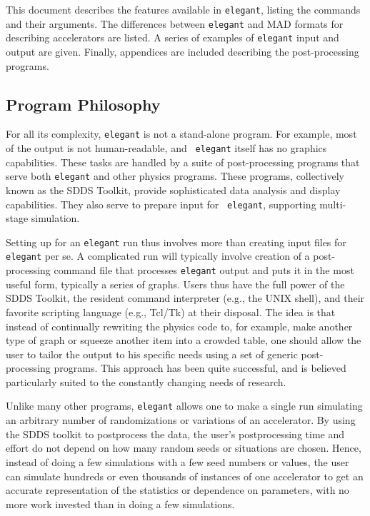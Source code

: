 \documentclass[11pt]{article}
\begin{document}
This document describes the features available in {\tt elegant},
listing the commands and their arguments.  The differences between
{\tt elegant} and MAD formats for describing accelerators are listed.
A series of examples of {\tt elegant} input and output are given.
Finally, appendices are included describing the post-processing
programs.

\subsection{Program Philosophy}

For all its complexity, {\tt elegant} is not a stand-alone program.
For example, most of the output is not human-readable, and {\tt
elegant} itself has no graphics capabilities.  These tasks are handled
by a suite of post-processing programs that serve both {\tt elegant}
and other physics programs.  These programs, collectively known as the
SDDS Toolkit\cite{SDDS1,SDDS2}, provide sophisticated data analysis
and display capabilities.  They also serve to prepare input for {\tt
elegant}, supporting multi-stage simulation.

Setting up for an {\tt elegant} run thus involves more than creating
input files for {\tt elegant} per se.  A complicated run will
typically involve creation of a post-processing command file that
processes {\tt elegant} output and puts it in the most useful form,
typically a series of graphs.  Users thus have the full power of the
SDDS Toolkit, the resident command interpreter (e.g., the UNIX shell),
and their favorite scripting language (e.g., Tcl/Tk) at their
disposal. The idea is that instead of continually rewriting the
physics code to, for example, make another type of graph or squeeze
another item into a crowded table, one should allow the user to tailor
the output to his specific needs using a set of generic
post-processing programs.  This approach has been quite successful,
and is believed particularly suited to the constantly changing needs
of research.

Unlike many other programs, {\tt elegant} allows one to make a single
run simulating an arbitrary number of randomizations or variations of
an accelerator.  By using the SDDS toolkit to postprocess the data,
the user's postprocessing time and effort do not depend on how many
random seeds or situations are chosen.  Hence, instead of doing a few
simulations with a few seed numbers or values, the user can simulate
hundreds or even thousands of instances of one accelerator to get an
accurate representation of the statistics or dependence on parameters,
with no more work invested than in doing a few simulations.
\end{document}
